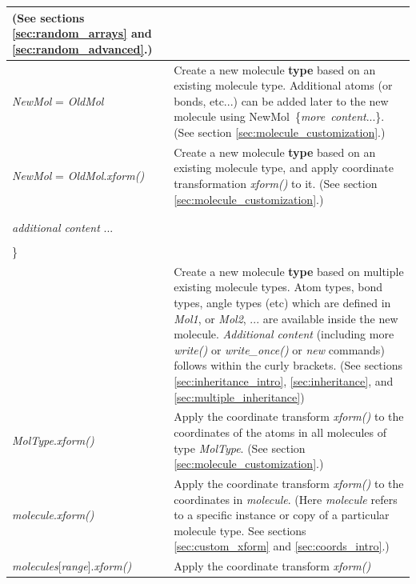 \documentclass[11pt]{article}
\begin{document}
\begin{longtable}[h]{l|p{9cm}}
(See sections \ref{sec:random_arrays} and \ref{sec:random_advanced}.)
\\
\hline
\textit{NewMol} = \textit{OldMol} &
Create a new molecule \textbf{type} based on an existing molecule type.
Additional atoms (or bonds, etc...) can be added later to the new molecule 
using \mbox{NewMol \{\textit{more\ content}...\}}.  
(See section \ref{sec:molecule_customization}.)
\\
\hline
\textit{NewMol} = \textit{OldMol}.\textit{xform()}
&
Create a new molecule \textbf{type} based on an existing molecule type,
and apply coordinate transformation \textit{xform()} to it.
(See section \ref{sec:molecule_customization}.)
\\
\hline
\begin{tabular}[t]{l}
\textit{NewMol} \textbf{inherits} \textit{Mol1} \textit{Mol2} ... \{ \\
\\
\hspace{0.35cm} \textit{additional content} ... \\
\\
\} \\
\end{tabular}
&
Create a new molecule \textbf{type} based on multiple existing molecule types.
Atom types, bond types, angle types (etc) which are defined in
\textit{Mol1}, or \textit{Mol2}, ... are available inside the
new molecule.
\textit{Additional content} 
(including more \textit{write()} or \textit{write\_once()}
or \textit{new} commands)
follows within the curly brackets.
(See sections \ref{sec:inheritance_intro},
\ref{sec:inheritance}, and \ref{sec:multiple_inheritance})
\\
\hline
\textit{MolType}.\textit{xform()}
&
Apply the coordinate transform \textit{xform()} to the coordinates 
of the atoms in all molecules of type \textit{MolType}.
(See section \ref{sec:molecule_customization}.)
\\
\hline
\textit{molecule}.\textit{xform()}
&
Apply the coordinate transform \textit{xform()} 
to the coordinates in \textit{molecule}.
(Here \textit{molecule} refers to a specific instance or copy of
 a particular molecule type.
See sections \ref{sec:custom_xform} and \ref{sec:coords_intro}.)
\\
\hline
\textit{molecules}[\textit{range}].\textit{xform()}
&
Apply the coordinate transform \textit{xform()} 

\end{longtable}
\end{document}
